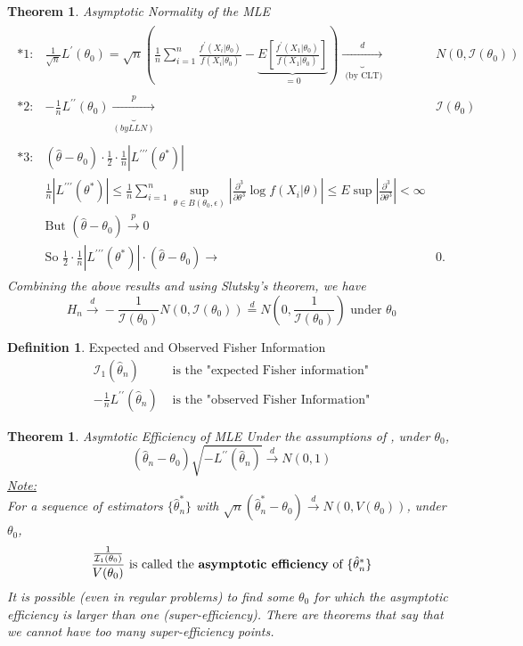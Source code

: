 \documentclass[letterpaper,11pt]{article}
\newcommand{\convprob}{\overset{p}\rightarrow}
\newcommand{\convdist}{\overset{d}\rightarrow}
\newcommand{\conv}{\rightarrow}
\newcommand{\FI}{\mathcal{I}}
\newcounter{thm}
\newtheorem{theorem}[thm]{Theorem}
\theoremstyle{definition}
\newcounter{def}
\newtheorem*{defn}{Definition}
\begin{document}
\begin{theorem}{Asymptotic Normality of the MLE}
{\begin{align*}
\begin{array}{rrl}
*1:& \frac{1}{\sqrt{n}}L^\prime(\theta_0) = \sqrt{n}\left(\frac{1}{n}\sum_{i=1}^n\frac{f^\prime(X_i|\theta_0)}{f(X_i|\theta_0)} - \underbrace{E\left[\frac{f^\prime(X_1|\theta_0)}{f(X_1|\theta_0)}\right]}_{=0}\right) \underbrace{\convdist}_{ \text{ (by CLT)}} &N(0,\FI(\theta_0))\\\\
*2:& -\frac{1}{n}L^{\prime\prime}(\theta_0) \underbrace{\convprob}_{(by LLN)} &\FI(\theta_0)\\\\
*3:& (\hat\theta - \theta_0) \cdot \frac{1}{2}\cdot \frac{1}{n}\left|L^{\prime\prime\prime}(\theta^\ast)\right|\\
&\frac{1}{n}\left|L^{\prime\prime\prime}(\theta^\ast)\right| \leq \frac{1}{n}\sum_{i=1}^n \sup_{\theta\in B(\theta_0,\epsilon)}\left|\frac{\partial^3}{\partial\theta^3}\log f(X_i|\theta)\right|\leq E\sup \left|\frac{\partial^3}{\partial\theta^3}\right| < \infty\\
&\text{But }(\hat\theta-\theta_0)\convprob 0\\
&\text{So }\frac{1}{2}\cdot \frac{1}{n}\left|L^{\prime\prime\prime}(\theta^\ast)\right|\cdot (\hat\theta - \theta_0)  \conv &0.
\end{array}
\end{align*}
Combining the above results and using Slutsky's theorem, we have $$H_n\convdist -\frac{1}{\FI(\theta_0)}N(0,\FI(\theta_0))\overset{d}{=}N\left(0,\frac{1}{\FI(\theta_0)}\right)\text{ under }\theta_0$$
}
\end{theorem}

\begin{defn}{Expected and Observed Fisher Information}\\
\begin{align*}
\FI_1(\hat\theta_n)& \text{ is the "expected Fisher information"}\\
-\frac{1}{n}L^{\prime\prime}(\hat\theta_n)& \text{ is the "observed Fisher Information"}
\end{align*}
\end{defn}

\begin{theorem}{Asymtotic Efficiency of MLE}
Under the assumptions of , under $\theta_0$, $$(\hat\theta_n-\theta_0)\sqrt{-L^{\prime\prime}(\hat\theta_n)}\convdist N(0,1)$$
\underline{Note:}\\
For a sequence of estimators $\{\hat\theta^\ast_n\}$ with $\sqrt{n}(\hat\theta^\ast_n-\theta_0)\convdist N\left(0,V(\theta_0)\right)$, under $\theta_0$,
$$\frac{\frac{1}{\FI_1(\theta_0)}}{V(\theta_0)} \text{ is called the \textbf{asymptotic efficiency} of }\{\hat\theta_n^\ast\}$$
It is possible (even in regular problems) to find some $\theta_0$ for which the asymptotic efficiency is larger than one (super-efficiency). There are theorems that say that we cannot have too many super-efficiency points.
\end{theorem}
\end{document}
